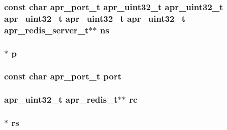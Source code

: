 \subsubsection[{\texorpdfstring{ns}{ns}}]{\setlength{\rightskip}{0pt plus 5cm}const char {\bf apr\+\_\+port\+\_\+t} {\bf apr\+\_\+uint32\+\_\+t} {\bf apr\+\_\+uint32\+\_\+t} {\bf apr\+\_\+uint32\+\_\+t} {\bf apr\+\_\+uint32\+\_\+t} {\bf apr\+\_\+uint32\+\_\+t} {\bf apr\+\_\+redis\+\_\+server\+\_\+t}$\ast$$\ast$ ns}\hypertarget{group__APR__Util__RC_ga16ebca092e717a050cdb4feb7bb59849}{}\label{group__APR__Util__RC_ga16ebca092e717a050cdb4feb7bb59849}
\subsubsection[{\texorpdfstring{p}{p}}]{$\ast$ p}\hypertarget{group__APR__Util__RC_ga2e727f881424334cf12d8af10f50ec6c}{}\label{group__APR__Util__RC_ga2e727f881424334cf12d8af10f50ec6c}
\subsubsection[{\texorpdfstring{port}{port}}]{\setlength{\rightskip}{0pt plus 5cm}const char {\bf apr\+\_\+port\+\_\+t} port}\hypertarget{group__APR__Util__RC_ga225c76c246a5cc263c5a2628eb99353e}{}\label{group__APR__Util__RC_ga225c76c246a5cc263c5a2628eb99353e}
\subsubsection[{\texorpdfstring{rc}{rc}}]{ {\bf apr\+\_\+uint32\+\_\+t} {\bf apr\+\_\+redis\+\_\+t}$\ast$$\ast$ rc}\hypertarget{group__APR__Util__RC_ga38828c1c35a96d3d86edce1458ba991f}{}\label{group__APR__Util__RC_ga38828c1c35a96d3d86edce1458ba991f}
\subsubsection[{\texorpdfstring{rs}{rs}}]{ $\ast$ rs}\hypertarget{group__APR__Util__RC_ga2f1b060c750d4f17eb602a451b6e4edc}{}\label{group__APR__Util__RC_ga2f1b060c750d4f17eb602a451b6e4edc}
